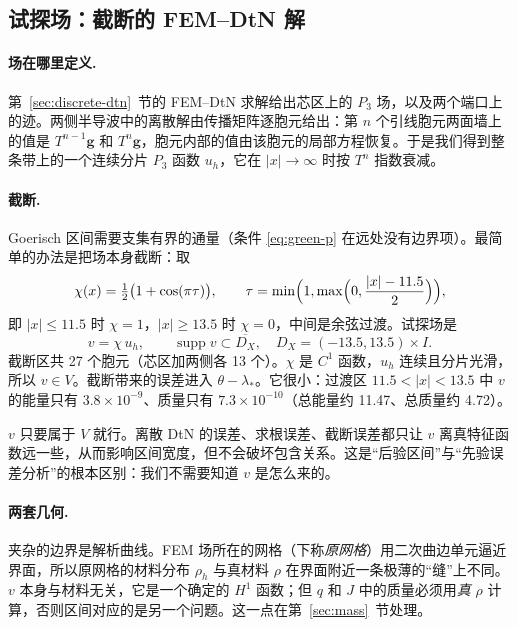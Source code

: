 \documentclass[11pt,a4paper,fontset=fandol]{ctexart}
\begin{document}
\subsection{试探场：截断的 FEM--DtN 解}

\paragraph{场在哪里定义.} 第~\ref{sec:discrete-dtn}~节的 FEM--DtN 求解给出芯区上的 $P_3$ 场，以及两个端口上的迹。两侧半导波中的离散解由传播矩阵逐胞元给出：第 $n$ 个引线胞元两面墙上的值是 $T^{n-1}\bm g$ 和 $T^n\bm g$，胞元内部的值由该胞元的局部方程恢复。于是我们得到整条带上的一个连续分片 $P_3$ 函数 $u_h$，它在 $|x|\to\infty$ 时按 $T^n$ 指数衰减。

\paragraph{截断.} Goerisch 区间需要支集有界的通量（条件 \eqref{eq:green-p} 在远处没有边界项）。最简单的办法是把场本身截断：取
\[
\chi(x)=\tfrac12\bigl(1+\cos(\pi\tau)\bigr),\qquad \tau=\min\Bigl(1,\max\Bigl(0,\frac{|x|-11.5}{2}\Bigr)\Bigr),
\]
即 $|x|\le11.5$ 时 $\chi=1$，$|x|\ge13.5$ 时 $\chi=0$，中间是余弦过渡。试探场是
\[
v=\chi\,u_h ,\qquad \operatorname{supp}v\subset\overline{D_X},\quad D_X=(-13.5,13.5)\times I .
\]
截断区共 27 个胞元（芯区加两侧各 13 个）。$\chi$ 是 $C^1$ 函数，$u_h$ 连续且分片光滑，所以 $v\in V$。截断带来的误差进入 $\theta-\lambda_*$。它很小：过渡区 $11.5<|x|<13.5$ 中 $v$ 的能量只有 $3.8\times10^{-9}$、质量只有 $7.3\times10^{-10}$（总能量约 11.47、总质量约 4.72）。

\begin{remark}
$v$ 只要属于 $V$ 就行。离散 DtN 的误差、求根误差、截断误差都只让 $v$ 离真特征函数远一些，从而影响区间宽度，但不会破坏包含关系。这是“后验区间”与“先验误差分析”的根本区别：我们不需要知道 $v$ 是怎么来的。
\end{remark}

\paragraph{两套几何.} 夹杂的边界是解析曲线。FEM 场所在的网格（下称\emph{原网格}）用二次曲边单元逼近界面，所以原网格的材料分布 $\rho_h$ 与真材料 $\rho$ 在界面附近一条极薄的“缝”上不同。$v$ 本身与材料无关，它是一个确定的 $H^1$ 函数；但 $q$ 和 $J$ 中的质量必须用\emph{真} $\rho$ 计算，否则区间对应的是另一个问题。这一点在第~\ref{sec:mass}~节处理。
\end{document}
